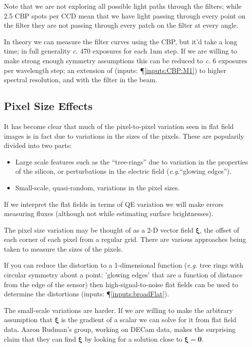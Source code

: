 \documentclass[12pt]{article}
\renewcommand{\c}{\textit{c.}\xspace}
\newcommand{\eg}{\textit{e.g.}\xspace}
\newcommand{\xib}{{\boldsymbol \xi}}
\newcommand{\zerob}{{\boldsymbol 0}}
\newcommand{\inputData}[1]{(inputs: \P \ref{inputs:#1})}
\begin{document}
Note that we are not exploring all possible light paths through the filters; while 2.5 CBP spots per CCD
mean that we have light passing through every point on the filter they are not passing through every
patch on the filter at every angle.

In theory we can measure the filter curves using the CBP, but it'd take a long time; in full generality \c 470
exposures for each 1nm step.  If we are willing to make strong enough symmetry assumptions this can be reduced
to \c 6 exposures per wavelength step; an extension of \inputData{CBP:M1} to higher spectral resolution, and
with the filter in the beam.

\subsection{Pixel Size Effects}
\label{sec:pixelSize}

It has become clear that much of the pixel-to-pixel variation seen in flat field images is
in fact due to variations in the sizes of the pixels.  These are popularily divided into two
parts:
\begin{itemize}
\item Large scale features such as the ``tree-rings'' due to variation in the properties of the
  silicon, or perturbations in the electric field (\eg ``glowing edges'').
\item Small-scale, quasi-random, variations in the pixel sizes.
\end{itemize}

If we interpret the flat fields in terms of QE variation we will make errors measuring fluxes (although
not while estimating surface brightnesses).

The pixel size variation may be thought of as a 2-D vector field $\xib$, the offset of each corner of each
pixel from a regular grid. There are various approaches being taken to measure the sizes of the pixels.

If you can reduce the distortion
to a 1-dimensional function (\eg tree rings with circular symmetry about a point; 'glowing edges' that are
a function of distance from the edge of the sensor) then high-signal-to-noise flat fields can be used to
determine the distortions \inputData{broadFlat}.

The small-scale variations are harder.  If we are willing to make the arbitrary assumption that $\xib$ is the
gradient of a scalar we can solve for it from flat field data.  Aaron Rudman's group, working on DECam data,
makes the surprising claim that they can find $\xib$ by looking for a solution close to $\xib = \zerob$.
\end{document}
